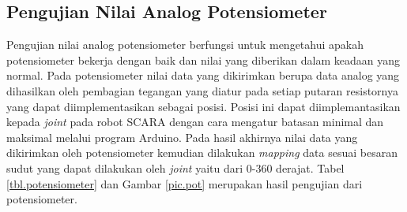 \subsection{Pengujian Nilai Analog Potensiometer}
Pengujian nilai analog potensiometer berfungsi untuk mengetahui apakah potensiometer bekerja dengan baik dan nilai yang diberikan dalam keadaan yang normal. Pada potensiometer nilai data yang dikirimkan berupa data analog yang dihasilkan oleh pembagian tegangan yang diatur pada setiap putaran resistornya yang dapat diimplementasikan sebagai posisi. Posisi ini dapat diimplemantasikan kepada \textit{joint} pada robot SCARA dengan cara mengatur batasan minimal dan maksimal melalui program Arduino. Pada hasil akhirnya nilai data yang dikirimkan oleh potensiometer kemudian dilakukan \textit{mapping} data sesuai besaran sudut yang dapat dilakukan oleh \textit{joint} yaitu dari 0-360 derajat. Tabel \ref{tbl.potensiometer}  dan Gambar \ref{pic.pot} merupakan hasil pengujian dari potensiometer.

